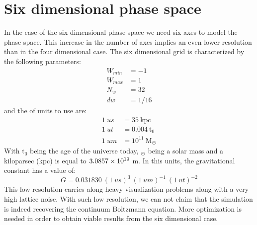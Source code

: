 \newpage
\section{Six dimensional phase space}
In the case of the six dimensional phase space we need six axes to model the phase space. This increase in the number of axes implies an even lower resolution than in the four dimensional case. The six dimensional grid is characterized by the following parameters:
\begin{align}
W_{min} &= -1\\
W_{max} &= 1\\
N_w &= 32\\
dw &= 1/16
\end{align}
and the of units to use are:
\begin{align}
1\ us &= 35\ \text{kpc}\\
1\ ut &= 0.004 \ \text{t}_0\\
1\ um &= 10^{11} \ \text{M}_{\astrosun}
\end{align}
With t$_0$ being the age of the universe today, $_{\astrosun}$ being a solar mass and a kiloparsec (kpc) is equal to $3.0857\times 10^{19}$ m. In this units, the gravitational constant has a value of:
\begin{equation}
G = 0.031830 \ (1 \ us)^3 \ (1 \ um)^{-1} \ (1 \ ut)^{-2}
\end{equation}
This low resolution carries along heavy visualization problems along with a very high lattice noise. With such low resolution, we can not claim that the simulation is indeed recovering the continuum Boltzmann equation. More optimization is needed in order to obtain viable results from the six dimensional case.










